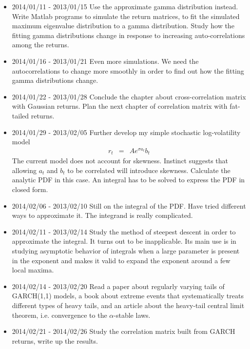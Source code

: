 \documentclass{article}
\begin{document}
\begin{itemize}
\item 2014/01/11 - 2013/01/15
Use the approximate gamma distribution instead. Write Matlab programs
to simulate the return matrices, to fit the simulated maximum
eigenvalue distribution to a gamma distribution. Study how the fitting
gamma distributions change in response to increasing auto-correlations
among the returns.

\item 2014/01/16 - 2013/01/21
Even more simulations. We need the autocorrelations to change more
smoothly in order to find out how the fitting gamma distributions
change.

\item 2014/01/22 - 2013/01/28
Conclude the chapter about cross-correlation matrix with Gaussian
returns. Plan the next chapter of correlation matrix with fat-tailed
returns.

\item 2014/01/29 - 2013/02/05
Further develop my simple stochastic log-volatility model
\begin{eqnarray*}
  r_t &=& A e^{\sigma a_t} b_t
\end{eqnarray*}
The current model does not account for skewness. Instinct suggests
that allowing $a_t$ and $b_t$ to be correlated will introduce
skewness. Calculate the analytic PDF in this case. An integral has to
be solved to express the PDF in closed form.

\item 2014/02/06 - 2013/02/10
Still on the integral of the PDF. Have tried different ways to
approximate it. The integrand is really complicated.

\item 2014/02/11 - 2013/02/14
Study the method of steepest descent in order to approximate the
integral. It turns out to be inapplicable. Its main use is in studying
asymptotic behavior of integrals when a large parameter is present in
the exponent and makes it valid to expand the exponent around a few
local maxima.

\item 2014/02/14 - 2013/02/20
Read a paper about regularly varying tails of GARCH(1,1) models, a
book about extreme events that systematically treats different types
of heavy tails, and an article about the heavy-tail central limit
theorem, i.e. convergence to the $\alpha$-stable laws.

\item 2014/02/21 - 2014/02/26
Study the correlation matrix built from GARCH returns, write up the
results.




\end{itemize}
\end{document}
